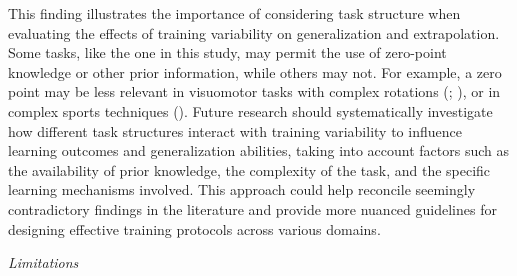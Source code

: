 \documentclass[
  11pt,
  letterpaper,
]{article}
\begin{document}
This finding illustrates the importance of considering task structure
when evaluating the effects of training variability on generalization
and extrapolation. Some tasks, like the one in this study, may permit
the use of zero-point knowledge or other prior information, while others
may not. For example, a zero point may be less relevant in visuomotor
tasks with complex rotations
(;
), or in complex sports techniques
().
Future research should systematically investigate how different task
structures interact with training variability to influence learning
outcomes and generalization abilities, taking into account factors such
as the availability of prior knowledge, the complexity of the task, and
the specific learning mechanisms involved. This approach could help
reconcile seemingly contradictory findings in the literature and provide
more nuanced guidelines for designing effective training protocols
across various domains.

\emph{Limitations}
\end{document}

